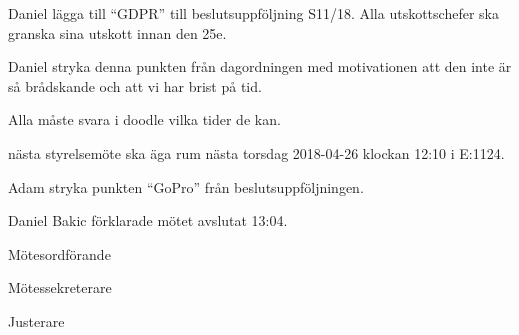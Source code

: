 \documentclass[10pt]{article}
\def\mo{Daniel Bakic}
\def\ms{Axel Voss}
\def\ji{Isabella Hansen}
\begin{document}
\begin{paragrafer}
	Daniel \ypa lägga till ``GDPR'' till beslutsuppföljning S11/18. Alla utskottschefer ska granska sina utskott innan den 25e.

	\Mbaby


	Daniel \ypa stryka denna punkten från dagordningen med motivationen att den inte är så brådskande och att vi har brist på tid.

	\Mbaby


	Alla måste svara i doodle vilka tider de kan.

	\Mba nästa styrelsemöte ska äga rum nästa torsdag 2018-04-26 klockan 12:10 i E:1124.



	Adam \ypa stryka punkten ``GoPro'' från beslutsuppföljningen.

	\Mbaby




	{\mo} förklarade mötet avslutat 13:04.
\end{paragrafer}

\hidesignfoot
\begin{signatures}{3}
	\signature{\mo}{Mötesordförande}
	\signature{\ms}{Mötessekreterare}
	\signature{\ji}{Justerare}
\end{signatures}
\end{document}
